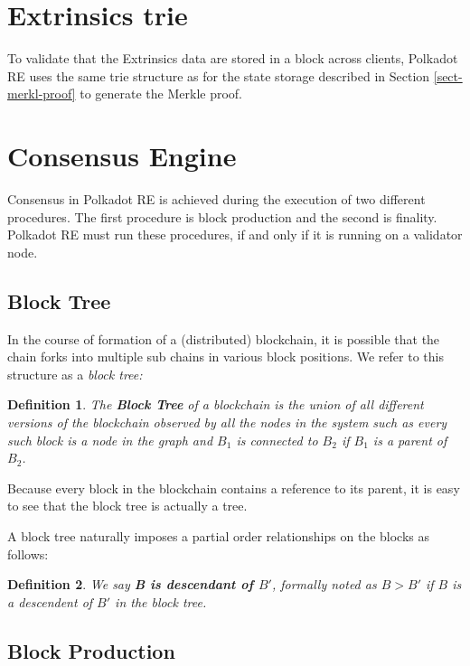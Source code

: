 \documentclass{article}
\newcommand{\tmem}[1]{{\em #1\/}}
\newcommand{\tmstrong}[1]{\textbf{#1}}
\newcommand{\tmtextbf}[1]{{\bfseries{#1}}}
\newcommand{\tmtextit}[1]{{\itshape{#1}}}
\newtheorem{definition}{Definition}
\providecommand{\tmem}[1]{\tmtextit{#1}}
\providecommand{\tmstrong}[1]{\tmtextbf{#1}}
\providecommand{\tmtextbf}[1]{\tmtextbf{#1}}
\providecommand{\tmtextit}[1]{\tmtextit{#1}}
\newtheorem{definition}{Definition}
\begin{document}
\section{Extrinsics trie}

To validate that the Extrinsics data are stored in a block across clients,
Polkadot RE uses the same trie structure as for the state storage described in
Section \ref{sect-merkl-proof} to generate the Merkle proof.

\section{Consensus Engine}

Consensus in Polkadot RE is achieved during the execution of two different
procedures. The first procedure is block production and the second is
finality. Polkadot RE must run these procedures, if and only if it is running
on a validator node.

\subsection{Block Tree}

In the course of formation of a (distributed) blockchain, it is possible that
the chain forks into multiple sub chains in various block positions. We refer
to this structure as a {\tmem{block tree:}}

\begin{definition}
  The {\tmstrong{Block Tree}} of a blockchain is the union of all different
  versions of the blockchain observed by all the nodes in the system such as
  every such block is a node in the graph and $B_1$ is connected to $B_2$ if
  $B_1$ is a parent of $B_2$.
\end{definition}

Because every block in the blockchain contains a reference to its parent, it
is easy to see that the block tree is actually a tree.

A block tree naturally imposes a partial order relationships on the blocks as
follows:

\begin{definition}
  We say {\tmstrong{B is descendant of $B'$}}, formally noted as {\tmstrong{$B
  > B'$}} if $B$ is a descendent of $B'$ in the block tree.
\end{definition}

\subsection{Block Production}
\end{document}
